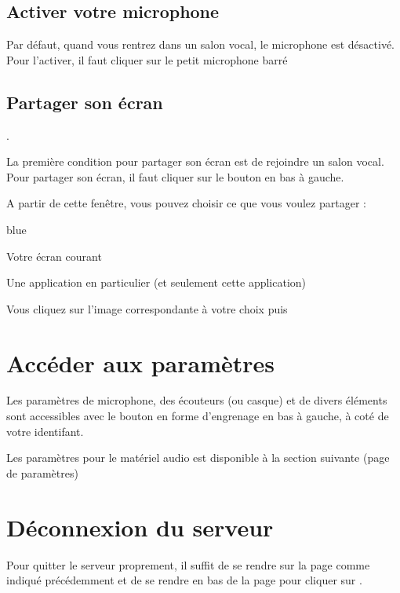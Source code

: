\subsection{Activer votre microphone}

Par défaut, quand vous rentrez dans un salon vocal, le microphone est désactivé. Pour l'activer, il faut cliquer sur le petit microphone barré 




\subsection{Partager son écran}.

La première condition pour partager son écran est de rejoindre un salon vocal. \\

Pour partager son écran, il faut cliquer sur le bouton  en bas à gauche.


A partir de cette fenêtre, vous pouvez choisir ce que vous voulez partager : 

	\begin{items}{blue}{\Triangle}
		\item Votre écran courant
		\item Une application en particulier (et seulement cette application)
	\end{items}

	Vous cliquez sur l'image correspondante à votre choix puis 


\section{Accéder aux paramètres}

Les paramètres de microphone, des écouteurs (ou casque) et de divers éléments sont accessibles avec le bouton en forme d'engrenage en bas à gauche, à coté de votre identifant.


Les paramètres pour le matériel audio est disponible à la section suivante (page de paramètres)



\section{Déconnexion du serveur}

Pour quitter le serveur proprement, il suffit de se rendre sur la page  comme indiqué précédemment et de se rendre en bas de la page pour cliquer sur .

\newpage
{}
